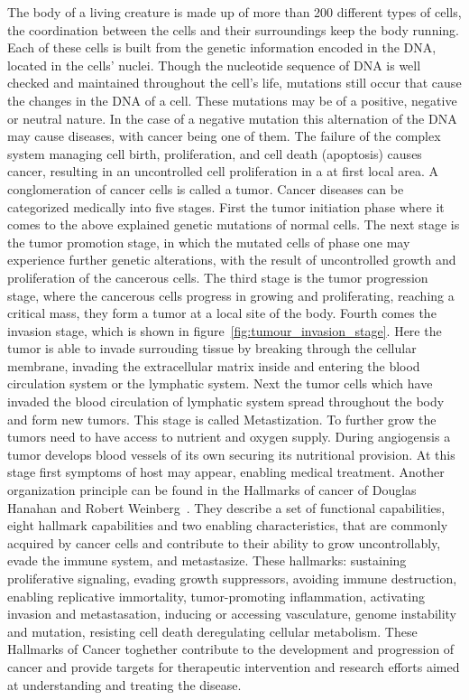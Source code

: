 The body of a living creature is made up of more than 200 different types of cells, the coordination between the cells and their surroundings keep the body running. Each of these cells is built from the genetic information encoded in the DNA, located in the cells' nuclei. Though the nucleotide sequence of DNA is well checked and maintained throughout the cell's life, mutations still occur that cause the changes in the DNA of a cell. These mutations may be of a positive, negative or neutral nature. In the case of a negative mutation this alternation of the DNA may cause diseases, with cancer being one of them. The failure of the complex system managing cell birth, proliferation, and cell death (apoptosis) causes cancer, resulting in an uncontrolled cell proliferation in a at first local area. A conglomeration of cancer cells is called a tumor. \newline
Cancer diseases can be categorized medically into five stages. First the tumor initiation phase where it comes to the above explained genetic mutations of normal cells. The next stage is the tumor promotion stage, in which the mutated cells of phase one may experience further genetic alterations, with the result of uncontrolled growth and proliferation of the cancerous cells. The third stage is the tumor progression stage, where the cancerous cells progress in growing and proliferating, reaching a critical mass, they form a tumor at a local site of the body. Fourth comes the invasion stage, which is shown in figure~\ref{fig:tumour_invasion_stage}. Here the tumor is able to invade surrouding tissue by breaking through the cellular membrane, invading the extracellular matrix inside and entering the blood circulation system or the lymphatic system. Next the tumor cells which have invaded the blood circulation of lymphatic system spread throughout the body and form new tumors. This stage is called Metastization. To further grow the tumors need to have access to nutrient and oxygen supply. During angiogensis a tumor develops blood vessels of its own securing its nutritional provision. At this stage first symptoms of host may appear, enabling medical treatment.\newline
Another organization principle can be found in the Hallmarks of cancer of Douglas Hanahan and Robert Weinberg~\cite{10.1158/2159-8290.CD-21-1059}. They describe a set of functional capabilities, eight hallmark capabilities and two enabling characteristics, that are commonly acquired by cancer cells and contribute to their ability to grow uncontrollably, evade the immune system, and metastasize. These hallmarks: sustaining proliferative signaling, evading growth suppressors, avoiding immune destruction, enabling replicative immortality, tumor-promoting inflammation, activating invasion and metastasation, inducing or accessing vasculature, genome instability and mutation, resisting cell death deregulating cellular metabolism. These Hallmarks of Cancer toghether contribute to the development and progression of cancer and provide targets for therapeutic intervention and research efforts aimed at understanding and treating the disease. 
